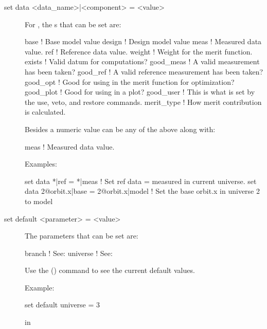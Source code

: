 {{\begin{description}
\item[set data <data\_name>|<component> = <value>] \Newline

\vskip -0.2in

For , the s that can be set are:
\begin{example}
  base        ! Base model value
  design      ! Design model value
  meas        ! Measured data value.
  ref         ! Reference data value.
  weight      ! Weight for the merit function.
  exists      ! Valid datum for computations?
  good_meas   ! A valid measurement has been taken?
  good_ref    ! A valid reference measurement has been taken?
  good_opt    ! Good for using in the merit function for optimization?
  good_plot   ! Good for using in a plot?
  good_user   ! This is what is set by the use, veto, and restore commands.
  merit_type  ! How merit contribution is calculated.
\end{example}
Besides a numeric value  can be any of the above along with:
\begin{example}
  meas        ! Measured data value.
\end{example}

Examples:
\begin{example}
  set data *|ref = *|meas       ! Set ref data = measured in current universe.
  set data 2@orbit.x|base = 2@orbit.x|model 
                                ! Set the base orbit.x in universe 2 to model
\end{example}


\item[set default <parameter> = <value>] \Newline

\vskip -0.2in

The parameters that can be set are:
\begin{example}
  branch            ! See: 
  universe          ! See: 
\end{example}

Use the  () command to see the current
default values.

Example:
\begin{example}
  set default universe = 3
\end{example}


 in


\end{description}}}
